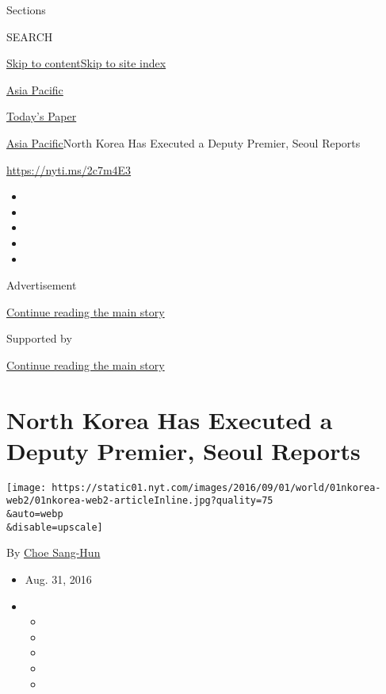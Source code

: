 Sections

SEARCH

\protect\hyperlink{site-content}{Skip to
content}\protect\hyperlink{site-index}{Skip to site index}

\href{https://www.nytimes.com/section/world/asia}{Asia Pacific}

\href{https://myaccount.nytimes.com/auth/login?response_type=cookie\&client_id=vi}{}

\href{https://www.nytimes.com/section/todayspaper}{Today's Paper}

\href{/section/world/asia}{Asia Pacific}\textbar{}North Korea Has
Executed a Deputy Premier, Seoul Reports

\url{https://nyti.ms/2c7m4E3}

\begin{itemize}
\item
\item
\item
\item
\item
\end{itemize}

Advertisement

\protect\hyperlink{after-top}{Continue reading the main story}

Supported by

\protect\hyperlink{after-sponsor}{Continue reading the main story}

\hypertarget{north-korea-has-executed-a-deputy-premier-seoul-reports}{%
\section{North Korea Has Executed a Deputy Premier, Seoul
Reports}\label{north-korea-has-executed-a-deputy-premier-seoul-reports}}

\texttt{[image: https://static01.nyt.com/images/2016/09/01/world/01nkorea-web2/01nkorea-web2-articleInline.jpg?quality=75\\\&auto=webp\\\&disable=upscale]}

By \href{http://www.nytimes.com/by/choe-sang-hun}{Choe Sang-Hun}

\begin{itemize}
\item
  Aug. 31, 2016
\item
  \begin{itemize}
  \item
  \item
  \item
  \item
  \item
  \end{itemize}
\end{itemize}

